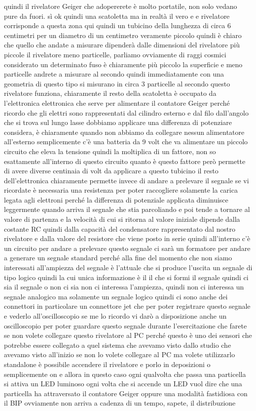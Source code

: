 {   quindi il rivelatore Geiger che adopererete è molto portatile, non solo vedano pure da fuori. sì ok quindi una scatoletta ma in realtà il vero e e rivelatore corrisponde a questa zona qui quindi un tubicino della lunghezza di circa 6 centimetri per un diametro di un centimetro veramente piccolo quindi è chiaro che quello che andate a misurare dipenderà dalle dimensioni del rivelatore più piccole il rivelatore meno particelle, parliamo ovviamente di raggi cosmici considerato un determinato fuso è chiaramente più piccolo la superficie e meno particelle andrete a misurare al secondo quindi immediatamente con una geometria di questo tipo si misurano in circa 3 particelle al secondo questo rivelatore funziona, chiaramente il resto della scatoletta è occupato da l'elettronica elettronica che serve per alimentare il contatore Geiger perché ricordo che gli elettri sono rappresentati dal cilindro esterno e dal filo dall'angolo che si trova sul lungo lasse dobbiamo applicare una differenza di potenziare considera, è chiaramente quando non abbiamo da collegare nessun alimentatore all'esterno semplicemente c'è una batteria da 9 volt che va alimentare un piccolo circuito che eleva la tensione quindi la moltiplica di un fattore, non so esattamente all'interno di questo circuito quanto è questo fattore però permette di avere diverse centinaia di volt da applicare a questo tubicino il resto dell'elettronica chiaramente permette invece di andare a prelevare il segnale se vi ricordate è necessaria una resistenza per poter raccogliere solamente la carica legata agli elettroni perché la differenza di potenziale applicata diminuisce leggermente quando arriva il segnale che stia parcoliando e poi tende a tornare al valore di partenza e la velocità di cui si ritorna al valore iniziale dipende dalla costante RC quindi dalla capacità del condensatore rappresentato dal nostro rivelatore e dalla valore del resistore che viene posto in serie quindi all'interno c'è un circuito per andare a prelevare questo segnale ci sarà un formatore per andare a generare un segnale standard perché alla fine del momento che non siamo interessati all'ampiezza del segnale è l'attuale che si produce l'uscita un segnale di tipo logico quindi la cui unica informazione è il il che si formi il segnale quindi ci sia il segnale o non ci sia non ci interessa l'ampiezza, quindi non ci interessa un segnale analogico ma solamente un segnale logico quindi ci sono anche dei connettori in particolare un connettore jet che per poter registrare questo segnale e vederlo all'oscilloscopio se me lo ricordo vi darò a disposizione anche un oscilloscopio per poter guardare questo segnale durante l'esercitazione che farete se non volete collegare questo rivelatore al PC perché questo è uno dei sensori che potrebbe essere collegato a quel sistema che avevamo visto dallo studio che avevamo visto all'inizio se non lo volete collegare al PC ma volete utilizzarlo standalone è possibile accendere il rivelatore e porlo in deposizioni o semplicemente on e allora in questo caso ogni qualvolta che passa una particella si attiva un LED luminoso ogni volta che si accende un LED vuol dire che una particella ha attraversato il contatore Geiger oppure una modalità fastidiosa con il BIP ovviamente non arriva a cadenza di un tempo, sapete, il distribuzione }
